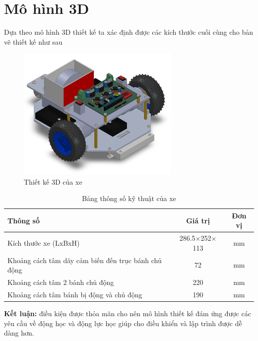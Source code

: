     \section{Mô hình 3D}
        \hspace*{0.6cm}Dựa theo mô hình 3D thiết kế ta xác định được các kích thước cuối cùng cho bản vẽ thiết kế như sau
        \begin{figure}[H]
            \centering
            \includegraphics[width=0.7\textwidth]{pictures/chapter3/3d.png}
            \caption{Thiết kế 3D của xe}
            \label{3d}
        \end{figure}
        \begin{table}[h!]
            \centering
            \caption{Bảng thông số kỹ thuật của xe}
            \begin{tabular}{|l|c|c|}
            \hline
            \textbf{Thông số} & \textbf{Giá trị} & \textbf{Đơn vị} \\ \hline
            Kích thước xe (LxBxH) & 286.5$\times$252$\times$113 & mm \\ \hline
            Khoảng cách tâm dãy cảm biến đến trục bánh chủ động & 72 & mm \\ \hline
            Khoảng cách tâm 2 bánh chủ động & 220 & mm \\ \hline
            Khoảng cách tâm bánh bị động và chủ động & 190 & mm \\ \hline
            \end{tabular}
        \end{table}
        \hspace*{0.6cm}\textbf{Kết luận:} điều kiện được thỏa mãn cho nên mô hình thiết kế đám ứng được các yêu cầu về động học và động lực học giúp cho điều khiển và lập trình được dễ dàng hơn.



